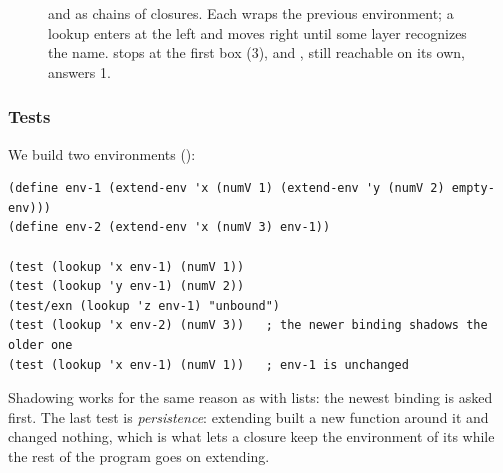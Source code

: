 \begin{figure}[htbp]
\centering
{}
\caption{ and  as chains of closures. Each  wraps the previous environment; a lookup enters at the left and moves right until some layer recognizes the name.  stops at the first box (3), and , still reachable on its own, answers 1.}
\label{fig:fnenv}
\end{figure}

\subsubsection{Tests} We build two environments ():
\begin{lstlisting}
(define env-1 (extend-env 'x (numV 1) (extend-env 'y (numV 2) empty-env)))
(define env-2 (extend-env 'x (numV 3) env-1))

(test (lookup 'x env-1) (numV 1))
(test (lookup 'y env-1) (numV 2))
(test/exn (lookup 'z env-1) "unbound")
(test (lookup 'x env-2) (numV 3))   ; the newer binding shadows the older one
(test (lookup 'x env-1) (numV 1))   ; env-1 is unchanged
\end{lstlisting}
Shadowing works for the same reason as with lists: the newest binding is asked first. The last test is \emph{persistence}: extending  built a new function around it and changed nothing, which is what lets a closure keep the environment of its  while the rest of the program goes on extending.

